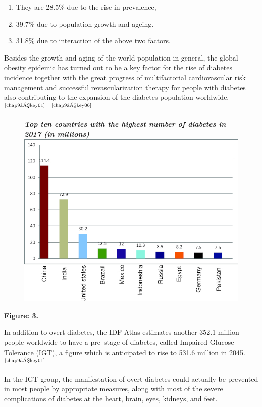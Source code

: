 \begin{enumerate}[1)]
\item They are 28.5\% due to the rise in prevalence,
 \item 39.7\% due to population growth and ageing.
 \item 31.8\% due to interaction of the above two factors.
 \end{enumerate}

Besides the growth and aging of the world population in general, the global obesity epidemic has turned out to be a key factor for the rise of diabetes incidence together with the great progress of multifactorial cardiovascular risk management and successful revascularization therapy for people with diabetes also contributing to the expansion of the diabetes population worldwide.$^{\text{\cite{chap9–key01}}}$$^-$$^{\text{\cite{chap9–key06}}}$

\begin{figure}[h]
\centering
\textbf{\textit{Top ten countries with the highest number of diabetes in 2017 (in millions)}}\\
\includegraphics[scale=2.4]{images/036.jpg}
\end{figure}

\noindent\textbf{Figure: 3.}

In addition to overt diabetes, the IDF Atlas estimates another 352.1 million people worldwide to have a pre–stage of diabetes, called Impaired Glucose Tolerance (IGT), a figure which is anticipated to rise to 531.6 million in 2045.$^{\text{\cite{chap9–key01}}}$

In the IGT group, the manifestation of overt diabetes could actually be prevented in most people by appropriate measures, along with most of the severe complications of diabetes at the heart, brain, eyes, kidneys, and feet.

